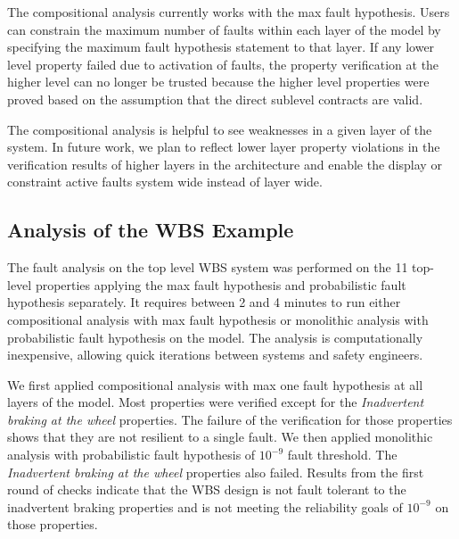 The compositional analysis currently works with the max fault hypothesis. Users can constrain the maximum number of faults within each layer of the model by specifying the maximum fault hypothesis statement to that layer. If any lower level property failed due to activation of faults, the property verification at the higher level can no longer be trusted because the higher level properties were proved based on the assumption that the direct sublevel contracts are valid.

The compositional analysis is helpful to see weaknesses in a given 
layer of the system. In future work, we plan to reflect lower layer
property violations in the verification results of higher layers in the architecture and enable the display or constraint active faults system wide instead of layer wide.


\subsection{Analysis of the WBS Example}
\label{sec:results}

The fault analysis on the top level WBS system was performed on the 11 top-level properties applying the max fault hypothesis and probabilistic fault hypothesis separately. It requires between 2 and 4 minutes to run either compositional analysis with max fault hypothesis or monolithic analysis with probabilistic fault hypothesis on the model. The analysis is computationally inexpensive, allowing quick iterations between systems and safety engineers.

We first applied compositional analysis with max one fault hypothesis at all layers of the model. Most properties were verified except for the \textit{Inadvertent braking at the wheel} properties. The failure of the verification for those properties shows that they are not resilient to a single fault. We then applied monolithic analysis with probabilistic fault hypothesis of $10^{-9}$ fault threshold. The \textit{Inadvertent braking at the wheel} properties also failed. Results from the first round of checks indicate that the WBS design is not fault tolerant to the inadvertent braking properties and is not meeting the reliability goals of $10^{-9}$ on those properties.

